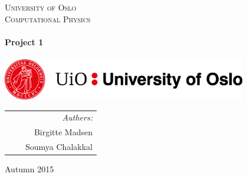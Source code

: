 \thispagestyle{empty}

\begin{center}



\textsc{\LARGE University of Oslo}\\[0.5cm]

\textsc{\Large Computational Physics}\\[2cm]
 

\HRule \\[0.4cm]
 \LARGE \textbf{Project 1}  \\[0.2cm]
\HRule \\[2.5cm]

\vspace{2cm}
\includegraphics[width=0.8\textwidth]{Figures/UiO_Seal_A_ENG.png}\\  %

\vfill 
 
\begin{tabularx}{\textwidth}{l X r}
\hline
\large \phantom{Authors:} & & \large \emph{Authers:}\\
\large \phantom{Andreas Valentin Pedersen} & &\large Birgitte Madsen\\
\large \phantom{Birgitte Madsen} & & \large Soumya Chalakkal \\
\hline

\end{tabularx}




\vfill

{\large Autumn 2015}

\end{center}
\cleardoublepage

